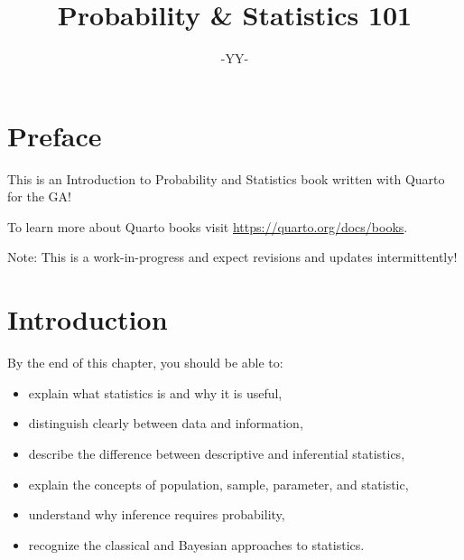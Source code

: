 \documentclass[
  letterpaper,
  DIV=11,
  numbers=noendperiod]{scrreprt}
\title{Probability \& Statistics 101}
\author{-YY-}
\date{}
\providecommand{\tightlist}{%
  \setlength{\itemsep}{0pt}\setlength{\parskip}{0pt}}
\renewcommand*\contentsname{Table of contents}
\newcommand\contentsname{Table of contents}
\begin{document}
\maketitle

\renewcommand*\contentsname{Table of contents}
{
\hypersetup{linkcolor=}
\setcounter{tocdepth}{2}
\tableofcontents
}
\listoffigures
\listoftables


\chapter*{Preface}\label{preface}


This is an Introduction to Probability and Statistics book written with
Quarto for the GA!

To learn more about Quarto books visit
\url{https://quarto.org/docs/books}.

Note: This is a work-in-progress and expect revisions and updates
intermittently!


\chapter{Introduction}\label{ch1}

\begin{tcolorbox}[enhanced jigsaw, coltitle=black, colbacktitle=quarto-callout-note-color!10!white, left=2mm, bottomrule=.15mm, bottomtitle=1mm, colback=white, titlerule=0mm, colframe=quarto-callout-note-color-frame, breakable, leftrule=.75mm, toptitle=1mm, opacitybacktitle=0.6, rightrule=.15mm, title=\textcolor{quarto-callout-note-color}{\faInfo}\hspace{0.5em}{Learning objectives}, arc=.35mm, opacityback=0, toprule=.15mm]

By the end of this chapter, you should be able to:

\begin{itemize}
\tightlist
\item
  explain what statistics is and why it is useful,
\item
  distinguish clearly between data and information,
\item
  describe the difference between descriptive and inferential
  statistics,
\item
  explain the concepts of population, sample, parameter, and statistic,
\item
  understand why inference requires probability,
\item
  recognize the classical and Bayesian approaches to statistics.
\end{itemize}

\end{tcolorbox}
\end{document}
